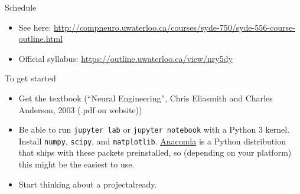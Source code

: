 \documentclass[aspectratio=169]{beamer}
\begin{document}
\begin{frame}{Schedule}
    \begin{itemize}
      \item See here: \url{http://compneuro.uwaterloo.ca/courses/syde-750/syde-556-course-outline.html}
      \item Official syllabus: \url{https://outline.uwaterloo.ca/view/nry5dy}
    \end{itemize}
\end{frame}

\begin{frame}{To get started}
  \begin{itemize}
    \item Get the textbook (\enquote{Neural Engineering}, Chris Eliasmith and Charles Anderson, 2003 (.pdf on website))
    \item Be able to run \texttt{jupyter lab} or \texttt{jupyter notebook} with a Python 3 kernel. Install \texttt{numpy}, \texttt{scipy}, and \texttt{matplotlib}. \href{https://www.anaconda.com/distribution/}{Anaconda} is a Python distribution that ships with these packets preinstalled, so (depending on your platform) this might be the easiest to use.
    \item Start thinking about a project\textellipsis already.
  \end{itemize}
\end{frame}
\end{document}
